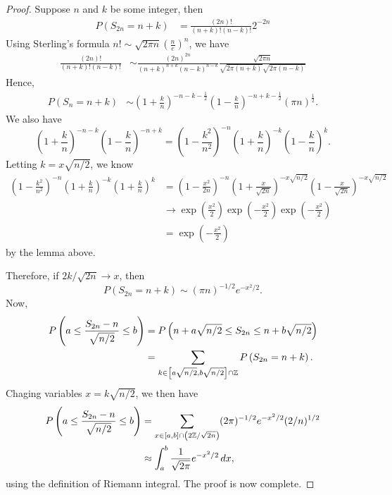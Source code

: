 \documentclass[a4paper]{article}
\begin{document}
\begin{proof}
  Suppose $n$ and $k$ be some integer, then 
  \begin{align*}
    P \left( S_{2n} = n + k \right)
    &= \frac{(2n) !}{(n + k) ! (n - k)!} 2^{-2n}
  \end{align*}
  Using Sterling's formula $n! \sim \sqrt{2 \pi n} (\frac{n}{e})^n$, 
  we have 
  \begin{align*}
    \frac{(2n) !}{(n + k) ! (n - k)!}
    &\sim \frac{ (2n)^{2n} }{(n + k)^{n + k} (n - k)^{n - k}} 
    \frac{\sqrt{2 \pi n}}{\sqrt{2 \pi (n + k)} \sqrt{2 \pi (n - k)}}
  \end{align*}
  Hence,
  \begin{align*}
    P \left( S_n = n + k \right)
    &\sim \left( 1 + \frac{k}{n} \right)^{- n - k - \frac{1}{2}} 
    \left( 1 - \frac{k}{n} \right)^{-n + k - \frac{1}{2}} 
    \left( \pi n \right)^{\frac{1}{2}}.
  \end{align*}
  We also have 
  \[
  \left( 1 + \frac{k}{n} \right)^{- n - k} 
  \left( 1 - \frac{k}{n} \right)^{-n + k} 
  = \left( 1 - \frac{k^2}{n^2} \right)^{-n} 
  \left( 1 + \frac{k}{n} \right)^{-k} 
  \left( 1 - \frac{k}{n} \right)^{k}.
  \]
  Letting $k = x \sqrt{n / 2}$, we know
  \begin{align*}
    \left( 1 - \frac{k^2}{n^2} \right)^{-n} 
    \left( 1 + \frac{k}{n} \right)^{-k} 
    \left( 1 + \frac{k}{n} \right)^{k}
    &= \left( 1 - \frac{x^2}{2 n} \right)^{-n} 
    \left( 1 + \frac{x}{\sqrt{2n}} \right)^{- x \sqrt{n/2}}
    \left( 1 - \frac{x}{\sqrt{2n}} \right)^{- x \sqrt{n/2}} \\
    &\to \exp \left( \frac{x^2}{2} \right) 
    \exp \left( - \frac{x^2}{2} \right) 
    \exp \left( - \frac{x^2}{2} \right) \\
    &= \exp \left( - \frac{x^2}{2} \right)
  \end{align*}
  by the lemma above.

  Therefore, if $2k / \sqrt{2n} \to x$, then 
  \[
  P \left( S_{2n} = n + k \right)
  \sim \left( \pi n \right)^{- 1 / 2} e^{- x^2 / 2}.
  \]
  Now, 
  \begin{align*}
    P \left( a \leq \frac{S_{2n} - n}{ \sqrt{n / 2} } \leq b \right)
   &= P \left( n + a \sqrt{n / 2} \leq S_{2n} \leq n + b \sqrt{n / 2} \right) \\
   &= \sum_{k \in \left[ a \sqrt{n / 2}, b \sqrt{n / 2} \right] \cap \mathbb{Z}}
   P \left( S_{2n} = n + k \right).
  \end{align*}
  Chaging variables $x = k \sqrt{n / 2}$, we then have 
  \begin{align*}
    P \left( a \leq \frac{S_{2n} - n}{\sqrt{n / 2}} \leq b \right) 
    &= \sum_{x \in [a, b] \cap \left( 2\mathbb{Z} / \sqrt{2n} \right)} 
    (2 \pi)^{- 1 / 2} e^{-x^2 / 2} (2 / n)^{1 / 2} \\
    &\approx \int_a^b \frac{1}{\sqrt{2 \pi}} e^{-x^2 / 2} \, d x,
  \end{align*}
  using the definition of Riemann integral. The proof is  
  now complete.

\end{proof}
\end{document}
